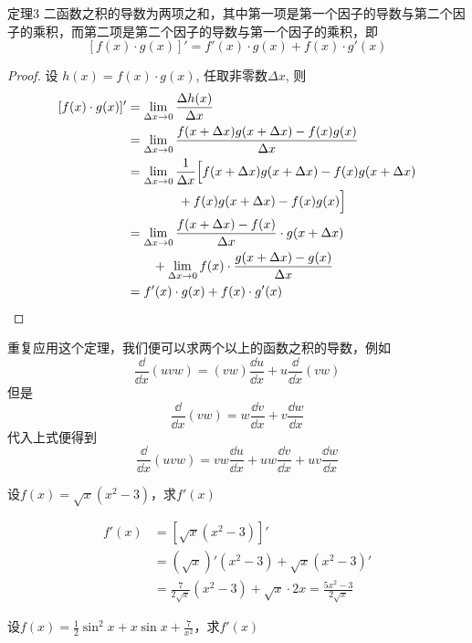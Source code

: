 \begin{blk}
    {定理3} 二函数之积的导数为两项之和，其中第一项是第一个因子的导数与第二个因子的乘积，而第二项是第二个因子的导数与第一个因子的乘积，即
\[[f (x) \cdot g (x) ] '=f' (x) \cdot g (x) +f (x) \cdot g' (x) \]
\end{blk}

\begin{proof}
    设 $h(x)=f(x)\cdot g(x)$, 任取非零数$\Delta x$, 则
\[\begin{split}
    [f(x)\cdot g(x)]'&=\lim_{\Delta x\to 0}\frac{\Delta h(x)}{\Delta x}\\
    &=\lim_{\Delta x\to 0}\frac{f(x+\Delta x)g(x+\Delta x)-f(x)g(x)}{\Delta x}\\
    &=\lim_{\Delta x\to 0}\frac{1}{\Delta x}\Bigl[f(x+\Delta x)g(x+\Delta x)-f(x)g(x+\Delta x)\\
    &\qquad\qquad +f(x)g(x+\Delta x)-f(x)g(x) \Bigr]\\
    &=\lim_{\Delta x\to 0}\frac{f(x+\Delta x)-f(x)}{\Delta x}\cdot g(x+\Delta x)\\
    &\qquad +\lim_{\Delta x\to 0}f(x)\cdot \frac{g(x+\Delta x)-g(x)}{\Delta x}\\
    &=f' (x) \cdot g (x) +f (x) \cdot g' (x) 
\end{split}\]
\end{proof}

重复应用这个定理，我们便可以求两个以上的函数之积的导数，例如
\[\frac{\dd }{\dd x}(uvw)=(vw)\frac{\dd u}{\dd x}+u\frac{\dd }{\dd x}(vw)\]
但是
\[\frac{\dd }{\dd x}(vw)=w\frac{\dd v}{\dd x}+v\frac{\dd w}{\dd x}\]
代入上式便得到
\[\frac{\dd }{\dd x}(uvw)=vw\frac{\dd u}{\dd x}+uw\frac{\dd v}{\dd x}+uv\frac{\dd w}{\dd x}\]


\begin{example}
    设$f(x)=\sqrt{x}(x^2-3)$，求$f'(x)$
\end{example}


\begin{solution}
    \[\begin{split}
f'(x)&=\left[\sqrt{x}(x^2-3)\right]'\\
&=\left(\sqrt{x}\right)'(x^2-3)+\sqrt{x}(x^2-3)'\\
&=\frac{7}{2\sqrt{x}}(x^2-3)+\sqrt{x}\cdot 2x = \frac{5x^2-3}{2\sqrt{x}}
    \end{split}\]
\end{solution}

\begin{example}
    设$f(x)=\frac{1}{2}\sin^2 x+x\sin x+\frac{7}{x^2}$，求$f'(x)$
\end{example}

